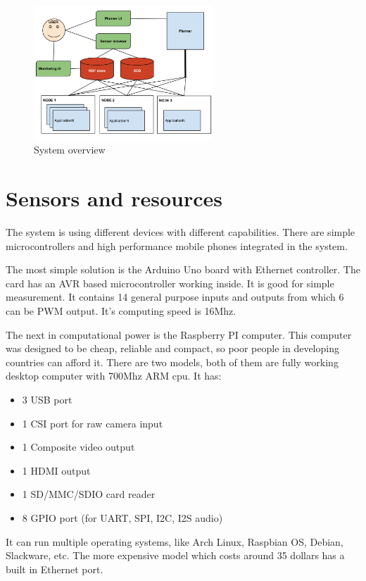 \begin{figure}[h]
	\centering
	\includegraphics[width=0.6\textwidth]{figures/sysarch.png}
	\caption{System overview\label{fig:sysover}}
\end{figure}

\section{Sensors and resources}
The system is using different devices with different capabilities. There are simple microcontrollers and high performance mobile phones integrated in the system. 

The most simple solution is the Arduino Uno board with Ethernet controller. The card has an AVR based microcontroller working inside. It is good for simple measurement. It contains 14 general purpose inputs and outputs from which 6 can be PWM output. It's computing speed is 16Mhz.

The next in computational power is the Raspberry PI computer. This computer was designed to be cheap, reliable and compact, so poor people in developing countries can afford it. There are two models, both of them are fully working desktop computer with 700Mhz ARM cpu. It has:
\begin{itemize}
	\item 3 USB port
	\item 1 CSI port for raw camera input
	\item 1 Composite video output
	\item 1 HDMI output
	\item 1 SD/MMC/SDIO card reader
	\item 8 GPIO port (for UART, SPI, I2C, I2S audio)
\end{itemize} 
 It can run multiple operating systems, like Arch Linux, Raspbian OS, Debian, Slackware, etc. The more expensive model which costs around 35 dollars has a built in Ethernet port.  

